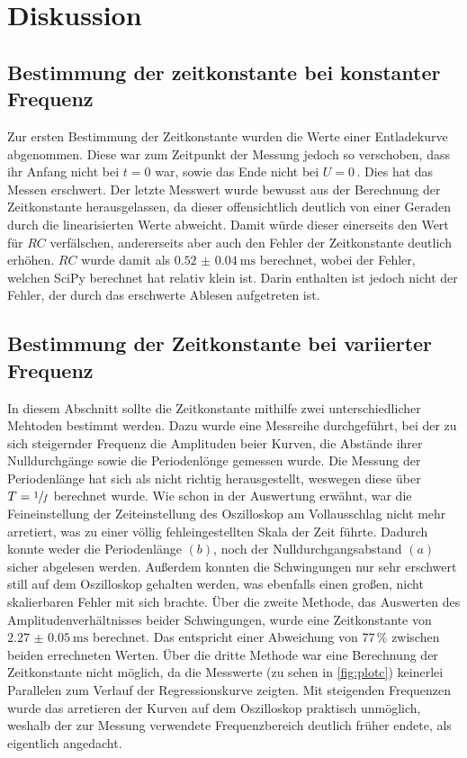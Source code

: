 \section{Diskussion}
\label{sec:Diskussion}
\subsection{Bestimmung der zeitkonstante bei konstanter Frequenz}
Zur ersten Bestimmung der Zeitkonstante wurden die Werte einer Entladekurve abgenommen.
Diese war zum Zeitpunkt der Messung jedoch so verschoben, dass ihr Anfang nicht bei $t=0$
war, sowie das Ende nicht bei $U=0$\,. Dies hat das Messen erschwert. Der letzte Messwert
wurde bewusst aus der Berechnung der Zeitkonstante herausgelassen, da dieser offensichtlich 
deutlich von einer Geraden durch die linearisierten Werte abweicht. Damit würde dieser einerseits
den Wert für $RC$ verfälschen, andererseits aber auch den Fehler der Zeitkonstante deutlich
erhöhen. $RC$ wurde damit als $\qty{0,52(0.04)}{\milli\second}$ berechnet, wobei der Fehler,
welchen SciPy berechnet hat relativ klein ist. Darin enthalten ist jedoch nicht der Fehler, der 
durch das erschwerte Ablesen aufgetreten ist. 
\subsection{Bestimmung der Zeitkonstante bei variierter Frequenz}
In diesem Abschnitt sollte die Zeitkonstante mithilfe zwei unterschiedlicher Mehtoden bestimmt werden.
Dazu wurde eine Messreihe durchgeführt, bei der zu sich steigernder Frequenz die Amplituden beier Kurven,
die Abstände ihrer Nulldurchgänge sowie die Periodenlönge gemessen wurde. Die Messung der Periodenlänge 
hat sich als nicht richtig herausgestellt, weswegen diese über $T=\sfrac{1}{f}$ berechnet wurde.
Wie schon in der Auswertung erwähnt, war die Feineinstellung der Zeiteinstellung des Oszilloskop am 
Vollausschlag nicht mehr arretiert, was zu einer völlig fehleingestellten Skala der Zeit führte. Dadurch 
konnte weder die Periodenlänge $(b)$, noch der Nulldurchgangsabstand $(a)$ sicher abgelesen werden. 
Außerdem konnten die Schwingungen nur sehr erschwert still auf dem Oszilloskop gehalten werden, was
ebenfalls einen großen, nicht skalierbaren Fehler mit sich brachte. 
Über die zweite Methode, das Auswerten des Amplitudenverhältnisses beider Schwingungen, wurde eine 
Zeitkonstante von $\qty{2,27(0.05)}{\milli\second}$ berechnet. Das entspricht einer Abweichung von
$77\,\%$ zwischen beiden errechneten Werten. Über die dritte Methode war eine Berechnung der Zeitkonstante 
nicht möglich, da die Messwerte (zu sehen in \autoref{fig:plotc}) keinerlei Parallelen zum Verlauf der 
Regressionskurve zeigten. 
Mit steigenden Frequenzen wurde das arretieren der Kurven auf dem Oszilloskop praktisch unmöglich, weshalb
der zur Messung verwendete Frequenzbereich deutlich früher endete, als eigentlich angedacht.
